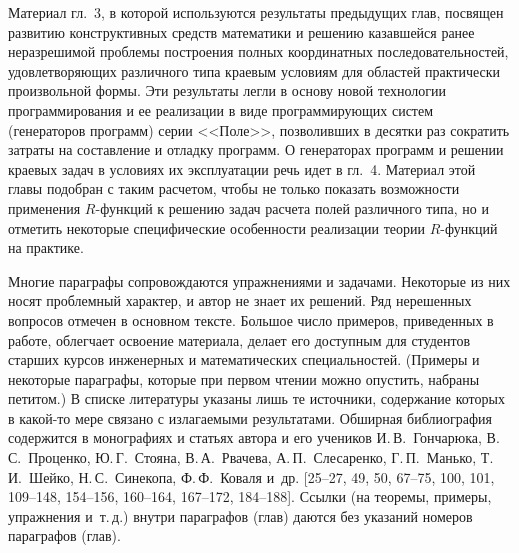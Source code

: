 Материал гл.~3, в которой используются результаты предыдущих глав, посвящен
развитию конструктивных средств математики и решению казавшейся ранее
неразрешимой проблемы построения полных координатных последовательностей,
удовлетворяющих различного типа краевым условиям для областей
%
практически произвольной формы. Эти результаты легли в основу новой
технологии программирования и ее реализации в виде программирующих систем
(генераторов программ) серии <<Поле>>, позволивших в десятки раз сократить
затраты на составление и отладку программ. О генераторах программ и решении
краевых задач в условиях их эксплуатации речь идет в гл.~4. Материал этой
главы подобран с таким расчетом, чтобы не только показать возможности
применения $R$-функций к решению задач расчета полей различного типа, но и
отметить некоторые специфические особенности реализации теории $R$-функций на
практике.

Многие параграфы сопровождаются упражнениями и задачами. Некоторые из них
носят проблемный характер, и автор не знает их решений. Ряд нерешенных
вопросов отмечен в основном тексте. Большое число примеров, приведенных
в работе, облегчает освоение материала, делает его доступным для студентов
старших курсов инженерных и математических специальностей. (Примеры
и некоторые параграфы, которые при первом чтении можно опустить, набраны
петитом.) В списке литературы указаны лишь те источники, содержание которых
в какой-то мере связано с излагаемыми результатами. Обширная библиография
содержится в монографиях и статьях автора и его учеников И.\,В.~Гончарюка,
В.\,С.~Проценко, Ю.\,Г.~Стояна, В.\,А.~Рвачева, А.\,П.~Слесаренко,
Г.\,П.~Манько, Т.\,И.~Шейко, Н.\,С.~Синекопа, Ф.\,Ф.~Коваля и~др. [25--27, 49,
50, 67--75, 100, 101, 109--148, 154--156, 160--164, 167--172, 184--188].
Ссылки (на теоремы, примеры, упражнения и~т.\,д.) внутри параграфов (глав)
даются без указаний номеров параграфов (глав).
